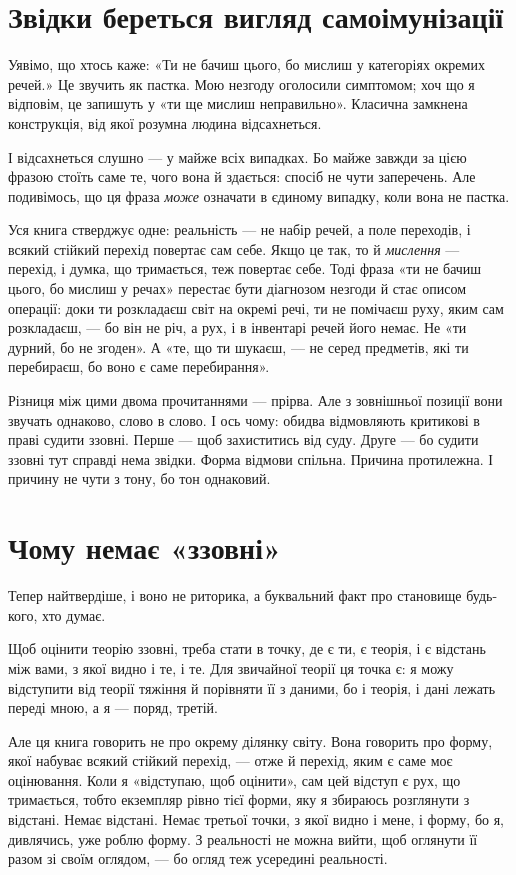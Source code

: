 \documentclass[12pt, a4paper, openany]{book}
\begin{document}
\section{Звідки береться вигляд самоімунізації}

Уявімо, що хтось каже: «Ти не бачиш цього, бо мислиш у категоріях окремих речей.» Це звучить як пастка. Мою незгоду оголосили симптомом; хоч що я відповім, це запишуть у «ти ще мислиш неправильно». Класична замкнена конструкція, від якої розумна людина відсахнеться.

І відсахнеться слушно --- у майже всіх випадках. Бо майже завжди за цією фразою стоїть саме те, чого вона й здається: спосіб не чути заперечень. Але подивімось, що ця фраза \emph{може} означати в єдиному випадку, коли вона не пастка.

Уся книга стверджує одне: реальність --- не набір речей, а поле переходів, і всякий стійкий перехід повертає сам себе. Якщо це так, то й \emph{мислення} --- перехід, і думка, що тримається, теж повертає себе. Тоді фраза «ти не бачиш цього, бо мислиш у речах» перестає бути діагнозом незгоди й стає описом операції: доки ти розкладаєш світ на окремі речі, ти не помічаєш руху, яким сам розкладаєш, --- бо він не річ, а рух, і в інвентарі речей його немає. Не «ти дурний, бо не згоден». А «те, що ти шукаєш, --- не серед предметів, які ти перебираєш, бо воно є саме перебирання».

Різниця між цими двома прочитаннями --- прірва. Але з зовнішньої позиції вони звучать однаково, слово в слово. І ось чому: обидва відмовляють критикові в праві судити ззовні. Перше --- щоб захиститись від суду. Друге --- бо судити ззовні тут справді нема звідки. Форма відмови спільна. Причина протилежна. І причину не чути з тону, бо тон однаковий.

\section{Чому немає «ззовні»}

Тепер найтвердіше, і воно не риторика, а буквальний факт про становище будь-кого, хто думає.

Щоб оцінити теорію ззовні, треба стати в точку, де є ти, є теорія, і є відстань між вами, з якої видно і те, і те. Для звичайної теорії ця точка є: я можу відступити від теорії тяжіння й порівняти її з даними, бо і теорія, і дані лежать переді мною, а я --- поряд, третій.

Але ця книга говорить не про окрему ділянку світу. Вона говорить про форму, якої набуває всякий стійкий перехід, --- отже й перехід, яким є саме моє оцінювання. Коли я «відступаю, щоб оцінити», сам цей відступ є рух, що тримається, тобто екземпляр рівно тієї форми, яку я збираюсь розглянути з відстані. Немає відстані. Немає третьої точки, з якої видно і мене, і форму, бо я, дивлячись, уже роблю форму. З реальності не можна вийти, щоб оглянути її разом зі своїм оглядом, --- бо огляд теж усередині реальності.
\end{document}
